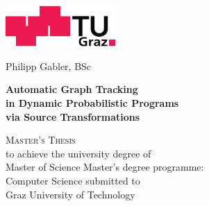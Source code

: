 

\begin{titlingpage}



\begin{center}
\includegraphics[width=42mm]{figures/TU_Graz_Logo.pdf}
\vfill\vfill\vfill

\sffamily

Philipp Gabler, BSc

\vfill

\begin{Spacing}{1.1}
\LARGE\bfseries Automatic Graph Tracking \\ in Dynamic Probabilistic Programs \\ via Source
Transformations
\end{Spacing}


\vfill\vfill\vfill\vfill

\textsc{Master's Thesis}\\
\vfill
to achieve the university degree of\\
{Master of Science}
\vfill
Master's degree programme:\\
Computer Science
\vfill\vfill\vfill
submitted to\\
Graz University of Technology


\end{center}
\end{titlingpage}

